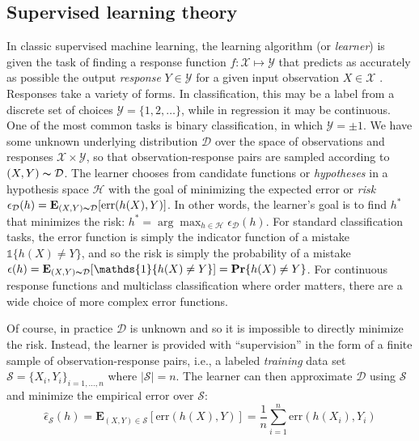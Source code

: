 \subsection{Supervised learning theory}

In classic supervised machine learning, the learning algorithm (or \textit{learner}) is given the task of finding a response function $f: \mathcal{X} \mapsto \mathcal{Y}$ that predicts as accurately as possible the output \textit{response} $Y \in \mathcal{Y}$ for a given input observation	 $X \in \mathcal{X}$ \cite{Mohri:2012}. Responses take a variety of forms. In classification, this may be a label from a discrete set of choices $\mathcal{Y} = \{ 1, 2, \dots\}$, while in regression it may be continuous. One of the most common tasks is binary classification, in which $\mathcal{Y} = \pm1$. We have some unknown underlying distribution $\mathcal{D}$ over the space of observations and responses $\mathcal{X} \times \mathcal{Y}$, so that observation-response pairs are sampled according to $(X, Y) \thicksim \mathcal{D}$. The learner chooses from candidate functions or \textit{hypotheses} in a hypothesis space $\mathcal{H}$ with the goal of minimizing the expected error or \textit{risk} $\epsilon_\mathcal{D}(h) = \mathbf{E}_{(X,Y)\thicksim \mathcal{D}}[\mathrm{err}(h(X), Y)]$. In other words, the learner's goal is to find $h^\ast$ that minimizes the risk: $h^\ast = \arg\max_{h \in \mathcal{H}} \epsilon_{\mathcal{D}}(h)$. For standard classification tasks, the error function is simply the indicator function of a mistake $\mathds{1}\{h(X) \not= Y\}$, and so the risk is simply the probability of a mistake $\epsilon(h) = \mathbf{E}_{(X,Y)\thicksim \mathcal{D}}[\mathds{1}\{h(X) \not= Y\}] = \mathbf{Pr}\{h(X) \not= Y\}$. For continuous response functions and multiclass classification where order matters, there are a wide choice of more complex error functions.

Of course, in practice $\mathcal{D}$ is unknown and so it is impossible to directly minimize the risk. Instead, the learner is provided with ``supervision'' in the form of a finite sample of observation-response pairs, i.e., a labeled \textit{training} data set $\mathcal{S} = \{ X_i, Y_i \}_{i=1, \dots, n}$ where $|\mathcal{S}| = n$. The learner can then approximate $\mathcal{D}$ using $\mathcal{S}$ and minimize the empirical error over $\mathcal{S}$:
\[
\hat{\epsilon}_{\mathcal{S}}(h) = \mathbf{E}_{(X,Y) \in \mathcal{S}}[\mathrm{err}(h(X), Y)] = \frac{1}{n} \sum_{i=1}^n \mathrm{err}(h(X_i), Y_i)
\]

